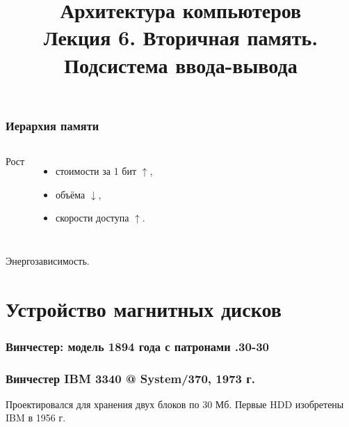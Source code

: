 \newcommand{\h}{handout,}



\title[Вторичная память. Подсистема I/O (1)]{Архитектура компьютеров\texorpdfstring{\\}{ }Лекция 6. Вторичная память.\texorpdfstring{\\}{ }Подсистема ввода-вывода}



\begin{frame}
\titlepage
\end{frame}


\begin{frame}
\frametitle{Иерархия памяти}
\vspace{-1cm}
\begin{columns}
    \column{7cm}

    \pause \column{4.5cm}
        Рост
        \begin{itemize}
            \item стоимости за 1 бит \pause $\uparrow$,\pause
            \item объёма \pause $\downarrow$,\pause
            \item скорости доступа \pause $\uparrow$.
        \end{itemize}
\end{columns}

\vspace{.5cm}
\pause Энергозависимость.
\end{frame}

\section{Устройство магнитных дисков}

\begin{frame}
\frametitle{Винчестер: модель 1894 года с патронами .30-30}
\end{frame}

\begin{frame}
\frametitle{Винчестер IBM 3340 @ System/370, 1973 г.}
Проектировался для хранения двух блоков по 30 Мб.
\pause Первые HDD изобретены IBM в 1956 г.
\end{frame}

